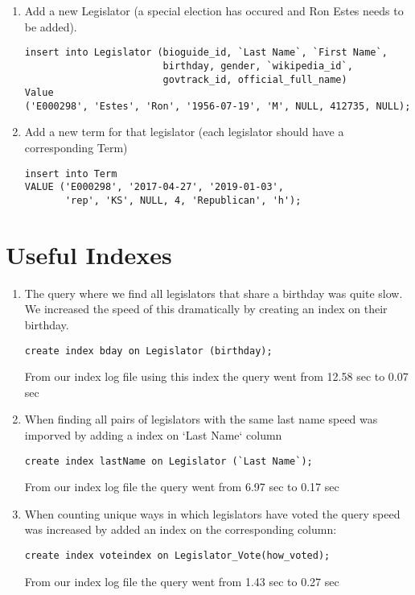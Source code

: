 \documentclass[11pt]{article}
\begin{document}
\begin{enumerate}
\item Add a new Legislator (a special election has occured and Ron Estes needs to be added).
\begin{verbatim}
insert into Legislator (bioguide_id, `Last Name`, `First Name`, 
                        birthday, gender, `wikipedia_id`, 
                        govtrack_id, official_full_name)     
Value     
('E000298', 'Estes', 'Ron', '1956-07-19', 'M', NULL, 412735, NULL);
\end{verbatim}

\item Add a new term for that legislator (each legislator should have a corresponding Term)
\begin{verbatim}
insert into Term 
VALUE ('E000298', '2017-04-27', '2019-01-03', 
       'rep', 'KS', NULL, 4, 'Republican', 'h');
\end{verbatim}
\end{enumerate}

\section{Useful Indexes}
\label{sec-3}

\begin{enumerate}
\item The query where we find all legislators that share a birthday was quite slow.
We increased the speed of this dramatically by creating an index on their birthday.
\begin{verbatim}
create index bday on Legislator (birthday);
\end{verbatim}
From our index log file using this index the query went from 12.58 sec to 0.07 sec

\item When finding all pairs of legislators with the same last name speed was
imporved by adding a index on `Last Name` column
\begin{verbatim}
create index lastName on Legislator (`Last Name`);
\end{verbatim}
From our index log file the query went from 6.97 sec to 0.17 sec

\item When counting unique ways in which legislators have voted the query speed
was increased by added an index on the corresponding column:
\begin{verbatim}
create index voteindex on Legislator_Vote(how_voted);
\end{verbatim}
From our index log file the query went from 1.43 sec to 0.27 sec
\end{enumerate}
\end{document}
